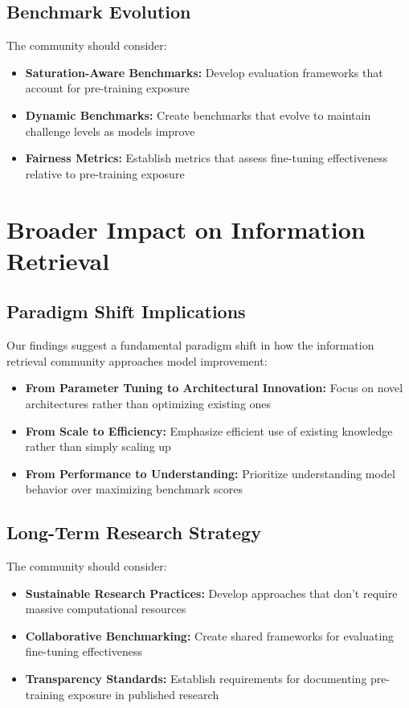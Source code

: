 \subsection{Benchmark Evolution}

The community should consider:

\begin{itemize}
\item \textbf{Saturation-Aware Benchmarks:} Develop evaluation frameworks that account for pre-training exposure
\item \textbf{Dynamic Benchmarks:} Create benchmarks that evolve to maintain challenge levels as models improve
\item \textbf{Fairness Metrics:} Establish metrics that assess fine-tuning effectiveness relative to pre-training exposure
\end{itemize}

\section{Broader Impact on Information Retrieval}

\subsection{Paradigm Shift Implications}

Our findings suggest a fundamental paradigm shift in how the information retrieval community approaches model improvement:

\begin{itemize}
\item \textbf{From Parameter Tuning to Architectural Innovation:} Focus on novel architectures rather than optimizing existing ones
\item \textbf{From Scale to Efficiency:} Emphasize efficient use of existing knowledge rather than simply scaling up
\item \textbf{From Performance to Understanding:} Prioritize understanding model behavior over maximizing benchmark scores
\end{itemize}

\subsection{Long-Term Research Strategy}

The community should consider:

\begin{itemize}
\item \textbf{Sustainable Research Practices:} Develop approaches that don't require massive computational resources
\item \textbf{Collaborative Benchmarking:} Create shared frameworks for evaluating fine-tuning effectiveness
\item \textbf{Transparency Standards:} Establish requirements for documenting pre-training exposure in published research
\end{itemize}

